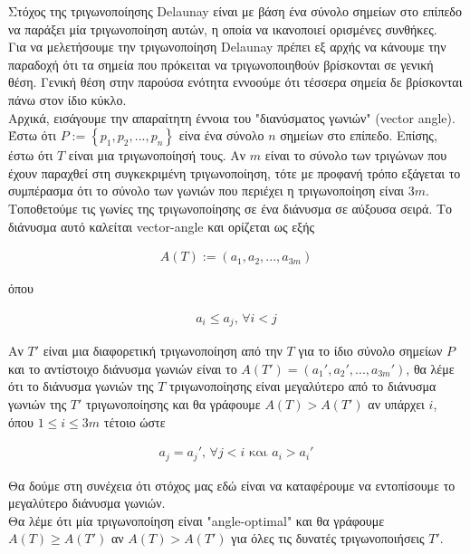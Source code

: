 \documentclass[oneside,12pt]{book}
\theoremstyle{definition}
\begin{document}
Στόχος της τριγωνοποίησης Delaunay είναι με βάση ένα σύνολο σημείων στο επίπεδο να παράξει μία τριγωνοποίηση αυτών, η οποία να ικανοποιεί ορισμένες συνθήκες. \\

Για να μελετήσουμε την τριγωνοποίηση Delaunay πρέπει εξ αρχής να κάνουμε την παραδοχή ότι τα σημεία που πρόκειται να τριγωνοποιηθούν βρίσκονται σε γενική θέση. Γενική θέση στην παρούσα ενότητα εννοούμε ότι τέσσερα σημεία δε βρίσκονται πάνω στον ίδιο κύκλο.   \\

Αρχικά, εισάγουμε την απαραίτητη έννοια του "διανύσματος γωνιών" (vector angle). Έστω ότι \(P := \left\{ p_1, p_2,...,p_n \right\}\) είνα ένα σύνολο \(n\) σημείων στο επίπεδο. Επίσης, έστω ότι \(Τ\) είναι μια τριγωνοποίησή τους. Αν \(m\) είναι το σύνολο των τριγώνων που έχουν παραχθεί στη συγκεκριμένη τριγωνοποίηση, τότε με προφανή τρόπο εξάγεται το συμπέρασμα ότι το σύνολο των γωνιών που περιέχει η τριγωνοποίηση είναι \(3m\). Τοποθετούμε τις γωνίες της τριγωνοποίησης σε ένα διάνυσμα σε αύξουσα σειρά. Το διάνυσμα αυτό καλείται vector-angle και ορίζεται ως εξής

\begin{align}
	A(T) := (a_1, a_2, ..., a_{3m})
\end{align}

όπου

\begin{align}
	a_i \leq a_j \text{, } \forall i<j
\end{align}

Αν \(Τ'\) είναι μια διαφορετική τριγωνοποίηση από την \(Τ\) για το ίδιο σύνολο σημείων \(P\) και το αντίστοιχο διάνυσμα γωνιών είναι το \(A(T') = (a_{1}', a_{2}', ..., a_{3m}')\), θα λέμε ότι το διάνυσμα γωνιών της \(Τ\) τριγωνοποίησης είναι μεγαλύτερο από το διάνυσμα γωνιών της \(Τ'\) τριγωνοποίησης και θα γράφουμε \(Α(Τ) > Α(Τ')\) αν υπάρχει \(i\), όπου \(1 \leq i \leq 3m\) τέτοιο ώστε

\begin{align*}
	a_j = a_{j}' \text{, } \forall j < i \text{ και } a_i > a_{i}'
\end{align*}

Θα δούμε στη συνέχεια ότι στόχος μας εδώ είναι να καταφέρουμε να εντοπίσουμε το μεγαλύτερο διάνυσμα γωνιών. \\

Θα λέμε ότι μία τριγωνοποίηση είναι "angle-optimal" και θα γράφουμε \(Α(Τ) \geq A(T')\) αν \(Α(Τ) > Α(Τ')\) για όλες τις δυνατές τριγωνοποιήσεις \(T'\). \\
\end{document}
